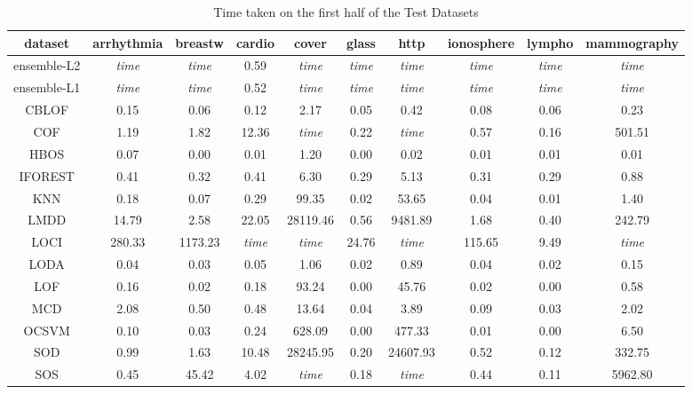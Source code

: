 \begin{table*}[!t]
\renewcommand{\arraystretch}{1.25}
\caption{Time taken on the first half of the Test Datasets}
\label{table:results:test-time-1}
\centering
\begin{tabular}{|c|c|c|c|c|c|c|c|c|c|}
    \hline
    \textbf{dataset} & \textbf{arrhythmia} & \textbf{breastw} & \textbf{cardio} & \textbf{cover} & \textbf{glass} & \textbf{http} & \textbf{ionosphere} & \textbf{lympho} & \textbf{mammography} \\
    \hline
    ensemble-L2 & \textit{time} & \textit{time} & 0.59 & \textit{time} & \textit{time} & \textit{time} & \textit{time} & \textit{time} & \textit{time} \\
    \hline
    ensemble-L1 & \textit{time} & \textit{time} & 0.52 & \textit{time} & \textit{time} & \textit{time} & \textit{time} & \textit{time} & \textit{time} \\
    \hline
    CBLOF & 0.15 & 0.06 & 0.12 & 2.17 & 0.05 & 0.42 & 0.08 & 0.06 & 0.23 \\
    \hline
    COF & 1.19 & 1.82 & 12.36 & \textit{time} & 0.22 & \textit{time} & 0.57 & 0.16 & 501.51 \\
    \hline
    HBOS & 0.07 & 0.00 & 0.01 & 1.20 & 0.00 & 0.02 & 0.01 & 0.01 & 0.01 \\
    \hline
    IFOREST & 0.41 & 0.32 & 0.41 & 6.30 & 0.29 & 5.13 & 0.31 & 0.29 & 0.88 \\
    \hline
    KNN & 0.18 & 0.07 & 0.29 & 99.35 & 0.02 & 53.65 & 0.04 & 0.01 & 1.40 \\
    \hline
    LMDD & 14.79 & 2.58 & 22.05 & 28119.46 & 0.56 & 9481.89 & 1.68 & 0.40 & 242.79 \\
    \hline
    LOCI & 280.33 & 1173.23 & \textit{time} & \textit{time} & 24.76 & \textit{time} & 115.65 & 9.49 & \textit{time} \\
    \hline
    LODA & 0.04 & 0.03 & 0.05 & 1.06 & 0.02 & 0.89 & 0.04 & 0.02 & 0.15 \\
    \hline
    LOF & 0.16 & 0.02 & 0.18 & 93.24 & 0.00 & 45.76 & 0.02 & 0.00 & 0.58 \\
    \hline
    MCD & 2.08 & 0.50 & 0.48 & 13.64 & 0.04 & 3.89 & 0.09 & 0.03 & 2.02 \\
    \hline
    OCSVM & 0.10 & 0.03 & 0.24 & 628.09 & 0.00 & 477.33 & 0.01 & 0.00 & 6.50 \\
    \hline
    SOD & 0.99 & 1.63 & 10.48 & 28245.95 & 0.20 & 24607.93 & 0.52 & 0.12 & 332.75 \\
    \hline
    SOS & 0.45 & 45.42 & 4.02 & \textit{time} & 0.18 & \textit{time} & 0.44 & 0.11 & 5962.80 \\
    \hline
    \end{tabular}
\end{table*}


